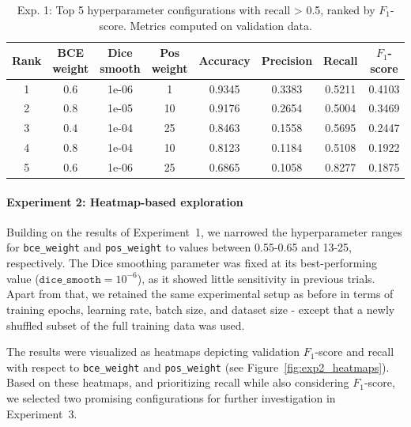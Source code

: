 \documentclass[12pt]{article}
\begin{document}
\begin{table}[t]
    \centering
    \begin{tabular}{c|ccc|cccc}
        \toprule
        Rank & BCE weight & Dice smooth & Pos weight & Accuracy & Precision & Recall & $F_1$-score \\
        \midrule
        1 & 0.6 & 1e-06 & 1 & 0.9345 & 0.3383 & 0.5211 & 0.4103 \\
        2 & 0.8 & 1e-05 & 10 & 0.9176 & 0.2654 & 0.5004 & 0.3469 \\
        3 & 0.4 & 1e-04 & 25 & 0.8463 & 0.1558 & 0.5695 & 0.2447 \\
        4 & 0.8 & 1e-04 & 10 & 0.8123 & 0.1184 & 0.5108 & 0.1922 \\
        5 & 0.6 & 1e-06 & 25 & 0.6865 & 0.1058 & 0.8277 & 0.1875 \\
        \bottomrule
    \end{tabular}
    \caption{Exp. 1: Top 5 hyperparameter configurations with recall > 0.5, ranked by $F_1$-score. Metrics computed on validation data.}
    \label{tab:exp1_top5}
\end{table}


\paragraph{Experiment 2: Heatmap-based exploration}  
Building on the results of Experiment~1, we narrowed the hyperparameter ranges for \texttt{bce\_weight} and \texttt{pos\_weight} to values between 0.55{-}0.65 and 13{-}25, respectively. The Dice smoothing parameter was fixed at its best-performing value ($\texttt{dice\_smooth} = 10^{-6}$), as it showed little sensitivity in previous trials. Apart from that, we retained the same experimental setup as before in terms of training epochs, learning rate, batch size, and dataset size - except that a newly shuffled subset of the full training data was used.

The results were visualized as heatmaps depicting validation $F_1$-score and recall with respect to \texttt{bce\_weight} and \texttt{pos\_weight} (see Figure~\ref{fig:exp2_heatmaps}). Based on these heatmaps, and prioritizing recall while also considering $F_1$-score, we selected two promising configurations for further investigation in Experiment~3.
\end{document}
